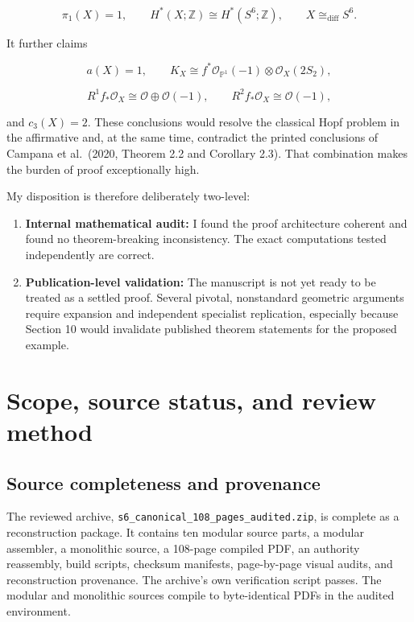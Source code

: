 \documentclass[
  10pt,
  letterpaper,
]{article}
\providecommand{\tightlist}{%
  \setlength{\itemsep}{0pt}\setlength{\parskip}{0pt}}
\newcommand{\Z}{\mathbb Z}
\newcommand{\Pone}{\mathbb P^1}
\newcommand{\cO}{\mathcal O}
\begin{document}
\[
\pi_1(X)=1,\qquad H^*(X;\Z)\cong H^*(S^6;\Z),\qquad X\cong_{\mathrm{diff}}S^6.
\]

It further claims

\[
a(X)=1,\qquad K_X\cong f^*\cO_{\Pone}(-1)\otimes\cO_X(2S_2),
\]

\[
R^1f_*\cO_X\cong\cO\oplus\cO(-1),\qquad R^2f_*\cO_X\cong\cO(-1),
\]

and \(c_3(X)=2\). These conclusions would resolve the classical Hopf
problem in the affirmative and, at the same time, contradict the printed
conclusions of Campana et al.~(2020, Theorem 2.2 and Corollary 2.3).
That combination makes the burden of proof exceptionally high.

My disposition is therefore deliberately two-level:

\begin{enumerate}
\def\labelenumi{\arabic{enumi}.}
\tightlist
\item
  \textbf{Internal mathematical audit:} I found the proof architecture
  coherent and found no theorem-breaking inconsistency. The exact
  computations tested independently are correct.
\item
  \textbf{Publication-level validation:} The manuscript is not yet ready
  to be treated as a settled proof. Several pivotal, nonstandard
  geometric arguments require expansion and independent specialist
  replication, especially because Section 10 would invalidate published
  theorem statements for the proposed example.
\end{enumerate}

\section{Scope, source status, and review
method}\label{scope-source-status-and-review-method}

\subsection{Source completeness and
provenance}\label{source-completeness-and-provenance}

The reviewed archive, \texttt{s6\_canonical\_108\_pages\_audited.zip},
is complete as a reconstruction package. It contains ten modular source
parts, a modular assembler, a monolithic source, a 108-page compiled
PDF, an authority reassembly, build scripts, checksum manifests,
page-by-page visual audits, and reconstruction provenance. The archive's
own verification script passes. The modular and monolithic sources
compile to byte-identical PDFs in the audited environment.
\end{document}
